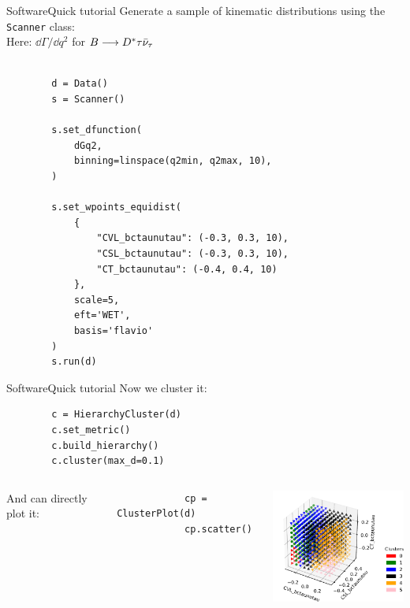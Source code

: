 \begin{frame}[t, fragile]{Software}{Quick tutorial}
    Generate a sample of kinematic distributions using the \texttt{Scanner} class:\\
    {\footnotesize Here: $\dd\Gamma/\dd q^2$ for $B\longrightarrow D^*\tau\bar\nu_\tau$}
    
    \begin{verbatim}
    
        d = Data()
        s = Scanner()
        
        s.set_dfunction(
            dGq2,
            binning=linspace(q2min, q2max, 10),
        )
        
        s.set_wpoints_equidist(
            {
                "CVL_bctaunutau": (-0.3, 0.3, 10),
                "CSL_bctaunutau": (-0.3, 0.3, 10),
                "CT_bctaunutau": (-0.4, 0.4, 10)
            },
            scale=5,
            eft='WET',
            basis='flavio'
        )
        s.run(d)
    \end{verbatim}
\end{frame}

\begin{frame}[fragile]{Software}{Quick tutorial}
    Now we cluster it: 
    
    \begin{verbatim}
        c = HierarchyCluster(d)
        c.set_metric()
        c.build_hierarchy()
        c.cluster(max_d=0.1)
    \end{verbatim}
    
    \begin{columns}
        And can directly plot it:
        
        \begin{changemargin}{0.32cm}{0cm}
        \begin{verbatim}
            cp = ClusterPlot(d)
            cp.scatter()
        \end{verbatim}
        \end{changemargin}
        \centering
        \includegraphics[width=5.5cm]{figures/plots/3d.pdf}
    \end{columns}
\end{frame}


